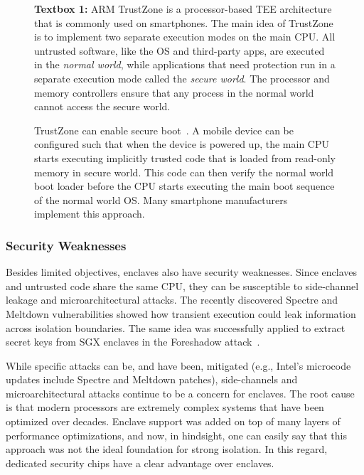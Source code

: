 \documentclass[letterpaper,twocolumn,10pt]{article}
\begin{document}
\begin{figure}
    \begin{tcolorbox}
    \textbf{Textbox 1:} 
    ARM TrustZone is a processor-based TEE architecture that is commonly used on smartphones. The main idea of TrustZone is to implement two separate execution modes on the main CPU. All untrusted software, like the OS and third-party apps, are executed in the \emph{normal world}, while applications that need protection run in a separate execution mode called the \emph{secure world}. The processor and memory controllers ensure that any process in the normal world cannot access the secure world.
    
    \hspace{10pt} TrustZone can enable secure boot~\cite{ekberg2014untapped}. A mobile device can be configured such that when the device is powered up, the main CPU starts executing implicitly trusted code that is loaded from read-only memory in secure world. This code can then verify the normal world boot loader before the CPU starts executing the main boot sequence of the normal world OS. Many smartphone manufacturers implement this approach.
    \end{tcolorbox}
\end{figure}  


\subsubsection*{Security Weaknesses}

Besides limited objectives, enclaves also have security weaknesses. Since enclaves and untrusted code share the same CPU, they can be susceptible to side-channel leakage and microarchitectural attacks. The recently discovered Spectre and Meltdown vulnerabilities showed how transient execution could leak information across isolation boundaries. The same idea was successfully applied to extract secret keys from SGX enclaves in the Foreshadow attack~\cite{van2018foreshadow}. 

While specific attacks can be, and have been, mitigated (e.g., Intel's microcode updates include Spectre and Meltdown patches), side-channels and microarchitectural attacks continue to be a concern for enclaves. The root cause is that modern processors are extremely complex systems that have been optimized over decades. Enclave support was added on top of many layers of performance optimizations, and now, in hindsight, one can easily say that this approach was not the ideal foundation for strong isolation. In this regard, dedicated security chips have a clear advantage over enclaves.
\end{document}
